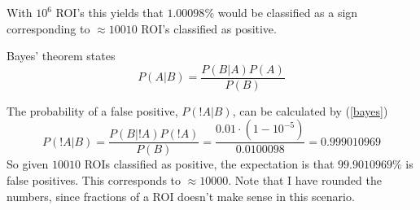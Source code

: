 \documentclass[10pt]{article}
\begin{document}
With $10^6$ ROI's this yields that $1.00098\%$ would be classified as a sign corresponding to $\approx 10010$ ROI's classified as positive. 

Bayes' theorem states
\begin{equation}
  P(A|B) = \frac{P(B | A) P(A)}{P(B)}
  \label{bayes}
\end{equation}

The probability of a false positive, $P(!A|B)$, can be calculated by (\ref{bayes}) 
\begin{equation}
P(!A|B) = \frac{P(B|!A)P(!A)}{P(B)} = \frac{0.01 \cdot (1-10^{-5})}{0.0100098} = 0.999010969    
\end{equation}
So given $10010$ ROIs classified as positive, the expectation is that $99.9010969\%$ is false positives. This corresponds to $\approx 10000$. Note that I have rounded the numbers, since fractions of a ROI doesn't make sense in this scenario.




\end{document}
